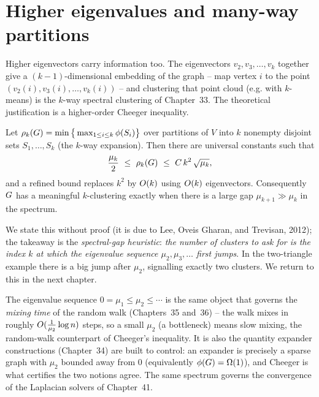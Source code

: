 \section{Higher eigenvalues and many-way partitions}
\label{ch32:higher}

Higher eigenvectors carry information too. The eigenvectors $v_2,v_3,\dots,v_k$ together give a $(k-1)$-dimensional embedding of the graph -- map vertex $i$ to the point $(v_2(i),v_3(i),\dots,v_k(i))$ -- and clustering that point cloud (e.g. with $k$-means) is the $k$-way spectral clustering of Chapter~33. The theoretical justification is a higher-order Cheeger inequality.

\begin{theorem}
\label{ch32:higher-cheeger}
Let $\rho_k(G)=\min\big\{\max_{1\le i\le k}\phi(S_i)\big\}$ over partitions of $V$ into $k$ nonempty disjoint sets $S_1,\dots,S_k$ (the $k$-way expansion). Then there are universal constants such that
\[
  \frac{\mu_k}{2}\ \le\ \rho_k(\Gph)\ \le\ C\,k^2\,\sqrt{\mu_k},
\]
and a refined bound replaces $k^2$ by $O(k)$ using $O(k)$ eigenvectors. Consequently $G$ has a meaningful $k$-clustering exactly when there is a large gap $\mu_{k+1}\gg\mu_k$ in the spectrum.
\end{theorem}

We state this without proof (it is due to Lee, Oveis Gharan, and Trevisan, 2012); the takeaway is the \emph{spectral-gap heuristic}: \emph{the number of clusters to ask for is the index $k$ at which the eigenvalue sequence $\mu_2,\mu_3,\dots$ first jumps}. In the two-triangle example there is a big jump after $\mu_2$, signalling exactly two clusters. We return to this in the next chapter.

\begin{connectionbox}
The eigenvalue sequence $0=\mu_1\le\mu_2\le\cdots$ is the same object that governs the \emph{mixing time} of the random walk (Chapters~35 and~36) -- the walk mixes in roughly $O(\tfrac{1}{\mu_2}\log n)$ steps, so a small $\mu_2$ (a bottleneck) means slow mixing, the random-walk counterpart of Cheeger's inequality. It is also the quantity expander constructions (Chapter~34) are built to control: an expander is precisely a sparse graph with $\mu_2$ bounded away from $0$ (equivalently $\phi(G)=\Omega(1)$), and Cheeger is what certifies the two notions agree. The same spectrum governs the convergence of the Laplacian solvers of Chapter~41.
\end{connectionbox}


